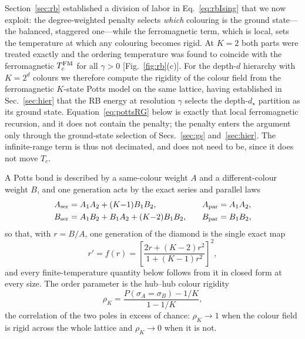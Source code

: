\documentclass[preprint,12pt]{elsarticle}
\begin{document}
Section~\ref{sec:rb} established a division of labor in Eq.~\eqref{eq:rbIsing}
that we now exploit: the degree-weighted penalty selects \emph{which} colouring
is the ground state---the balanced, staggered one---while the ferromagnetic
term, which is local, sets the temperature at which any colouring becomes
rigid. At $K=2$ both parts were treated exactly and the ordering temperature
was found to coincide with the ferromagnetic $T_c^{\rm FM}$ for all $\gamma>0$
[Fig.~\ref{fig:rb}(c)]. For the depth-$d$ hierarchy with $K=2^d$ colours we
therefore compute the rigidity of the colour field from the ferromagnetic
$K$-state Potts model on the same lattice, having established in
Sec.~\ref{sec:hier} that the RB energy at resolution $\gamma$ selects the
depth-$d_\star$ partition as its ground state. Equation~\eqref{eq:pottsRG}
below is exactly that local ferromagnetic recursion, and it does not contain
the penalty; the penalty enters the argument only through the ground-state
selection of Secs.~\ref{sec:gs} and~\ref{sec:hier}. The infinite-range term is
thus not decimated, and does not need to be, since it does not move $T_c$.

A Potts bond is described by a same-colour weight $A$ and a different-colour
weight $B$, and one generation acts by the exact series and parallel laws
\begin{equation}
\begin{aligned}
  A_{\rm ser} &= A_1A_2 + (K{-}1)B_1B_2, \\
  B_{\rm ser} &= A_1B_2 + B_1A_2 + (K{-}2)B_1B_2,
\end{aligned}
\qquad
\begin{aligned}
  A_{\rm par} &= A_1A_2,\\
  B_{\rm par} &= B_1B_2,
\end{aligned}
  \label{eq:pottsRG}
\end{equation}
so that, with $r=B/A$, one generation of the diamond is the single exact map
\begin{equation}
  r' = f(r) = \left[\frac{2r+(K{-}2)r^2}{1+(K{-}1)r^2}\right]^{2},
  \label{eq:rmap}
\end{equation}
and every finite-temperature quantity below follows from it in closed form at
every size. The order parameter is the hub--hub colour rigidity
\begin{equation}
  \rho_K = \frac{P(\sigma_A=\sigma_B)-1/K}{1-1/K},
  \label{eq:rho}
\end{equation}
the correlation of the two poles in excess of chance: $\rho_K\to1$ when the
colour field is rigid across the whole lattice and $\rho_K\to0$ when it is not.
\end{document}

